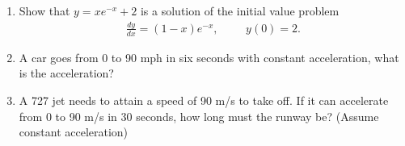 \documentclass[11pt]{article}
\begin{document}
\begin{enumerate}
\item Show that $y=xe^{-x}+2$ is a solution of the initial value problem
  \begin{align*}
  \frac{dy}{dx} = (1-x)e^{-x},&&& y(0)=2.
  \end{align*}

  \vfill

  \newpage

\item A car goes from 0 to 90 mph in six seconds with constant
  acceleration, what is the acceleration?

  \vfill

\item A 727 jet needs to attain a speed of 90 m/s to take off. If it
  can accelerate from 0 to 90 m/s in 30 seconds, how long must the
  runway be? (Assume constant acceleration)

  \vfill

\end{enumerate}
\end{document}
